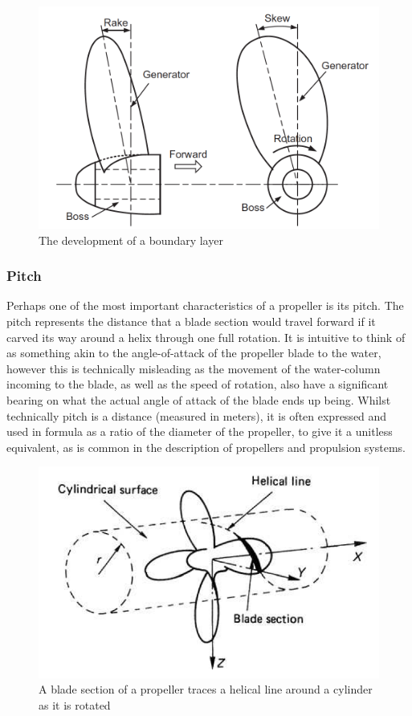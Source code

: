 \documentclass{article}\usepackage[]{graphicx}\usepackage[]{color}
\begin{document}
\begin{figure}
\includegraphics[width=\textwidth]{SkewRake.png}
\caption{The development of a boundary layer \parencite[262]{mollard2011}}
\label{fig:SkewRake.png}
\end{figure}

\subsubsection{Pitch}
Perhaps one of the most important characteristics of a propeller is its pitch.  The pitch represents the distance that a blade section would travel forward if it carved its way around a helix through one full rotation.  It is intuitive to think of as something akin to the angle-of-attack of the propeller blade to the water, however this is technically misleading as the movement of the water-column incoming to the blade, as well as the speed of rotation, also have a significant bearing on what the actual angle of attack of the blade ends up being.  Whilst technically pitch is a distance (measured in meters), it is often expressed and used in formula as a ratio of the diameter of the propeller, to give it a unitless equivalent, as is common in the description of propellers and propulsion systems.

\begin{figure}
\includegraphics[width=\textwidth]{HelicalLine.png}
\caption{A blade section of a propeller traces a helical line around a cylinder as it is rotated \parencite{carlton2007}}
\label{fig:HelicalLine.png}
\end{figure}
\end{document}
